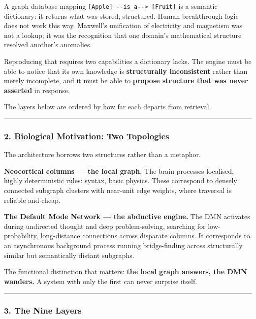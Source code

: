 \documentclass[
  11pt,
  a4paper,
]{article}
\begin{document}
A graph database mapping
\texttt{{[}Apple{]}\ -\/-is\_a-\/-\textgreater{}\ {[}Fruit{]}} is a
semantic dictionary: it returns what was stored, structured. Human
breakthrough logic does not work this way. Maxwell's unification of
electricity and magnetism was not a lookup; it was the recognition that
one domain's mathematical structure resolved another's anomalies.

Reproducing that requires two capabilities a dictionary lacks. The
engine must be able to notice that its own knowledge is
\textbf{structurally inconsistent} rather than merely incomplete, and it
must be able to \textbf{propose structure that was never asserted} in
response.

The layers below are ordered by how far each departs from retrieval.

\begin{center}\rule{0.5\linewidth}{0.5pt}\end{center}

\subsubsection{2. Biological Motivation: Two
Topologies}\label{biological-motivation-two-topologies}

The architecture borrows two structures rather than a metaphor.

\textbf{Neocortical columns --- the local graph.} The brain processes
localised, highly deterministic rules: syntax, basic physics. These
correspond to densely connected subgraph clusters with near-unit edge
weights, where traversal is reliable and cheap.

\textbf{The Default Mode Network --- the abductive engine.} The DMN
activates during undirected thought and deep problem-solving, searching
for low-probability, long-distance connections across disparate columns.
It corresponds to an asynchronous background process running
bridge-finding across structurally similar but semantically distant
subgraphs.

The functional distinction that matters: \textbf{the local graph
answers, the DMN wanders.} A system with only the first can never
surprise itself.

\begin{center}\rule{0.5\linewidth}{0.5pt}\end{center}

\subsubsection{3. The Nine Layers}\label{the-nine-layers}
\end{document}
